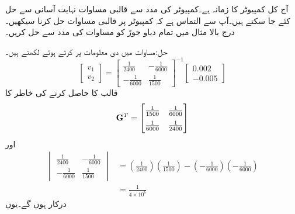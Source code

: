 آج کل کمپیوٹر کا زمانہ ہے۔کمپیوٹر کی مدد سے قالبی مساوات نہایت آسانی سے حل کئے جا سکتے ہیں۔آپ سے التماس ہے کہ کمپیوٹر پر قالبی مساوات حل کرنا سیکھیں۔
درج بالا مثال میں تمام دباو جوڑ کو مساوات  کی مدد سے حل کریں۔

حل:مساوات  میں دی معلومات پر کرتے ہوئے لکھتے ہیں۔
\begin{equation*}
\begin{bmatrix}
v_1\\[6pt]
v_2
\end{bmatrix}
=
\begin{bmatrix}
\frac{1}{2400} & -\frac{1}{6000}\\[6pt]
-\frac{1}{6000}& \frac{1}{1500}
\end{bmatrix}^{-1}
\begin{bmatrix}
0.002\\[6pt]
-0.005
\end{bmatrix}
\end{equation*}
قالب  کا   حاصل کرنے کی خاطر  کا   
\begin{align*}
{\bf{G}}^T=
\begin{bmatrix}   
 \frac{1}{1500}& \frac{1}{6000}\\[6pt]
\frac{1}{6000}& \frac{1}{2400}
\end{bmatrix}
\end{align*}
اور  
\begin{align*}
\begin{vmatrix}
\frac{1}{2400} & -\frac{1}{6000}\\[6pt]
-\frac{1}{6000}& \frac{1}{1500}
\end{vmatrix}
&=\left(\frac{1}{2400} \right)\left( \frac{1}{1500}\right) -\left(-\frac{1}{6000} \right) \left(- \frac{1}{6000}\right)\\
&=\frac{1}{4\times 10^{6}}
\end{align*}
درکار ہوں گے۔یوں
